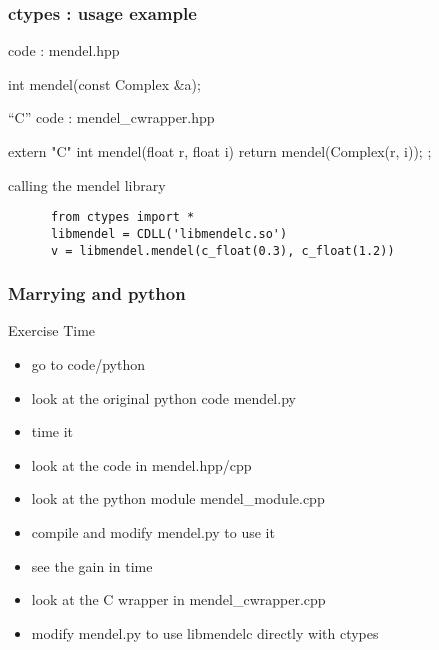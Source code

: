 \begin{frame}[fragile]
  \frametitle{ctypes : usage example}
  \begin{block}{\cpp code : mendel.hpp}
    \begin{cppcode*}{}
      int mendel(const Complex &a);
    \end{cppcode*}
  \end{block}
  \begin{block}{``C'' code : mendel\_cwrapper.hpp}
    \begin{cppcode*}{}
      extern "C" {
        int mendel(float r, float i) {
          return mendel(Complex(r, i));
        };
      }
    \end{cppcode*}
  \end{block}
  \begin{exampleblock}{calling the mendel library}
    \begin{verbatim}
      from ctypes import *
      libmendel = CDLL('libmendelc.so')
      v = libmendel.mendel(c_float(0.3), c_float(1.2))
    \end{verbatim}
  \end{exampleblock}
\end{frame}

\begin{frame}[fragile]
  \frametitle{Marrying \cpp and python}
  \begin{alertblock}{Exercise Time}
    \begin{itemize}
    \item go to code/python
    \item look at the original python code mendel.py
    \item time it
    \item look at the code in mendel.hpp/cpp
    \item look at the python module mendel\_module.cpp
    \item compile and modify mendel.py to use it
    \item see the gain in time
    \item look at the C wrapper in mendel\_cwrapper.cpp
    \item modify mendel.py to use libmendelc directly with ctypes
    \end{itemize}
  \end{alertblock}
\end{frame}
